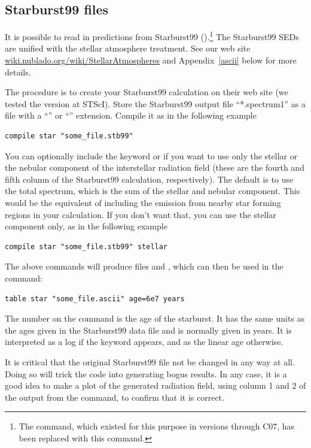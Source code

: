 \subsection{Starburst99 files}

It is possible to read in predictions from Starburst99 
(\citealp{Leitherer1999}).\footnote{The  command, 
which existed for this purpose in versions through C07, has been replaced
with this   command.}
The Starburst99 SEDs are unified with the stellar
atmosphere treatment.
See our web site
\href{http://gitlab.nublado.org/cloudy/cloudy/-/wikis/StellarAtmospheres}{wiki.nublado.org/wiki/StellarAtmospheres} and
Appendix~\ref{ascii} below for more details.

The procedure is to create your Starburst99 calculation on their web site
(we tested the version at STScI).
Store the Starburst99 output file ``*.spectrum1'' as
a file with a ``''  or ``'' extension.
Compile it as in the following example
\begin{verbatim}
compile star "some_file.stb99"
\end{verbatim}
You can optionally include the keyword  or
 if you want to use only the stellar or the nebular
component of the interstellar radiation field (these are the fourth and fifth
column of the Starburst99 calculation, respectively). The default is to use
the total spectrum, which is the sum of the stellar and nebular component.
This would be the equivalent of including the emission from nearby star
forming regions in your calculation. If you don't want that, you can use the
stellar component only, as in the following example
\begin{verbatim}
compile star "some_file.stb99" stellar
\end{verbatim}
The above commands will produce files  and
, which can then
be used in the  command:
\begin{verbatim}
table star "some_file.ascii" age=6e7 years
\end{verbatim}

The number on the  command is the
age of the starburst.  It has the same units as the ages given in the
Starburst99 data file and is normally given in years.
It is interpreted as a log if the keyword  appears,
and as the linear age otherwise.

It is critical that the original Starburst99 file not be
changed in any way at all.
Doing so will trick the code into generating bogus results.
In any case, it is a good idea to make a plot of the generated
radiation field,
using column 1 and 2 of the output from
the  command, to confirm that it is correct.

